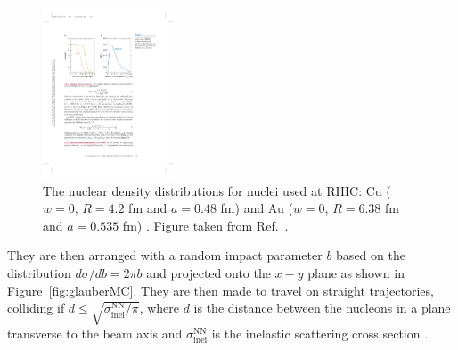 \begin{figure}[htbp]
\begin{center}
\includegraphics[width=0.35\textwidth]{figures/theory/nuclearDensity}
\caption{ The nuclear density distributions for nuclei used at RHIC: Cu ($w = 0$, $R = 4.2$ fm and $a =0.48$ fm)  and Au ($w = 0$, $R = 6.38$ fm and $a =0.535$ fm) \cite{DEVRIES1987495}.
Figure taken from Ref.~\cite{doi:10.1146/annurev.nucl.57.090506.123020}.}
\label{fig:nuclearDensity}
\end{center}
\end{figure}

They are then arranged with a random impact parameter $b$ based on the distribution $d\sigma/d b = 2\pi b$ and projected onto the $x-y$ plane as shown in Figure~\ref{fig:glauberMC}.
They are then made to travel on straight trajectories, colliding if $d \leq \sqrt{\sigma_{\mathrm{inel}}^{\mathrm{NN}}/ \pi}$, where $d$ is the distance between the nucleons in a plane transverse to the beam axis and $\sigma_{\mathrm{inel}}^{\mathrm{NN}}$ is the inelastic scattering cross section \cite{doi:10.1146/annurev.nucl.57.090506.123020, Alver:2008aq}.

